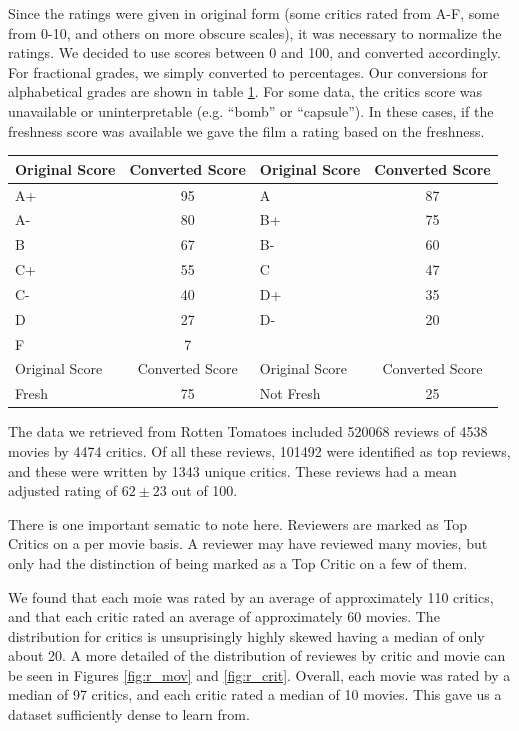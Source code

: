 \documentclass[12pt]{article}
\begin{document}
Since the ratings were given in original form (some critics rated from A-F, 
some from 0-10, and others on more obscure scales), it was necessary to 
normalize the ratings. We decided to use scores between 0 and 100, and converted
accordingly. For fractional grades, we simply converted to percentages. Our 
conversions for alphabetical grades are shown in table \ref{tab:conv}. For some 
data, the critics score was unavailable or uninterpretable (e.g. ``bomb'' or 
``capsule''). In these cases, if the freshness score was available we gave the 
film a rating based on the freshness.

\begin{table}[H]
\centering
\begin{tabular}{ | l | c | l | c |}

\hline
Original Score & Converted Score & Original Score & Converted Score \\
\hline
A+ & 95 & A  & 87 \\
A- & 80 & B+ & 75 \\
B  & 67 & B- & 60 \\
C+ & 55 & C  & 47 \\
C- & 40 & D+ & 35 \\
D  & 27 & D- & 20 \\
F  & 7 &    &     \\
\hline
Original Score & Converted Score & Original Score & Converted Score \\
\hline
Fresh & 75 & Not Fresh & 25 \\
\hline
\end{tabular}
\label{tab:conv}
\end{table}

The data we retrieved from Rotten Tomatoes included 520068 reviews of 4538 
movies by 4474 critics. Of all these reviews, 101492 were identified as top 
reviews, and these were written by 1343 unique critics. These reviews had a 
mean adjusted rating of $ 62 \pm 23$ out of 100.

There is one important sematic to note here. Reviewers are marked as Top 
Critics on a per movie basis. A reviewer may have reviewed many movies, but 
only had the distinction of being marked as a Top Critic on a few of them. 

We found that each moie was rated by an average of approximately 110 critics, 
and that each critic rated an average of approximately 60 movies. 
The distribution for critics is unsuprisingly highly skewed having a median 
of only about 20. A more detailed of the distribution of reviewes by critic
and movie can be seen in Figures \ref{fig:r_mov} and \ref{fig:r_crit}.
Overall, each movie was rated by a median of 97 critics, and each critic rated 
a median of 10 movies. This gave us a dataset sufficiently dense to learn from.
\end{document}
